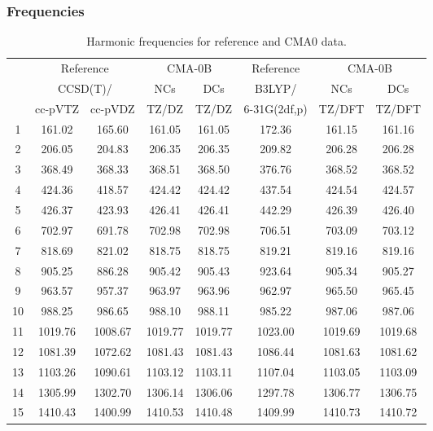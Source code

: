 \documentclass[10pt,oneside]{article}
\begin{document}
\clearpage

\subsubsection*{Frequencies}
\begin{table}[h!]
\centering
\caption{Harmonic frequencies for reference and CMA0 data.}
\begin{tabular}{cccccccc}
\toprule
{} & \multicolumn{2}{c}{Reference} & \multicolumn{2}{c}{CMA-0B} &    Reference & \multicolumn{2}{c}{CMA-0B} \\
{} & \multicolumn{2}{c}{CCSD(T)/} &     NCs &     DCs &       B3LYP/ &     NCs &     DCs \\
{} &   cc-pVTZ & cc-pVDZ &   TZ/DZ &   TZ/DZ & 6-31G(2df,p) &  TZ/DFT &  TZ/DFT \\
\midrule
1  &    161.02 &  165.60 &  161.05 &  161.05 &       172.36 &  161.15 &  161.16 \\
2  &    206.05 &  204.83 &  206.35 &  206.35 &       209.82 &  206.28 &  206.28 \\
3  &    368.49 &  368.33 &  368.51 &  368.50 &       376.76 &  368.52 &  368.52 \\
4  &    424.36 &  418.57 &  424.42 &  424.42 &       437.54 &  424.54 &  424.57 \\
5  &    426.37 &  423.93 &  426.41 &  426.41 &       442.29 &  426.39 &  426.40 \\
6  &    702.97 &  691.78 &  702.98 &  702.98 &       706.51 &  703.09 &  703.12 \\
7  &    818.69 &  821.02 &  818.75 &  818.75 &       819.21 &  819.16 &  819.16 \\
8  &    905.25 &  886.28 &  905.42 &  905.43 &       923.64 &  905.34 &  905.27 \\
9  &    963.57 &  957.37 &  963.97 &  963.96 &       962.97 &  965.50 &  965.45 \\
10 &    988.25 &  986.65 &  988.10 &  988.11 &       985.22 &  987.06 &  987.06 \\
11 &   1019.76 & 1008.67 & 1019.77 & 1019.77 &      1023.00 & 1019.69 & 1019.68 \\
12 &   1081.39 & 1072.62 & 1081.43 & 1081.43 &      1086.44 & 1081.63 & 1081.62 \\
13 &   1103.26 & 1090.61 & 1103.12 & 1103.11 &      1107.04 & 1103.05 & 1103.09 \\
14 &   1305.99 & 1302.70 & 1306.14 & 1306.06 &      1297.78 & 1306.77 & 1306.75 \\
15 &   1410.43 & 1400.99 & 1410.53 & 1410.48 &      1409.99 & 1410.73 & 1410.72 \\

\end{tabular}
\end{table}
\end{document}
